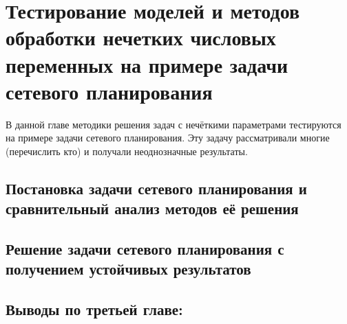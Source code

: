 \chapter{Тестирование моделей и методов обработки нечетких числовых переменных на примере задачи сетевого планирования}
\label{chapter3}

В данной главе методики решения задач с нечёткими параметрами тестируются на примере задачи сетевого планирования. Эту задачу рассматривали многие (перечислить кто) и получали неоднозначные результаты.

\section{Постановка задачи сетевого планирования и сравнительный анализ методов её решения} 
\label{chapter3_1}


\section{Решение задачи сетевого планирования с получением устойчивых результатов}
\label{chapter3_2}


\newpage
\section*{Выводы по третьей главе:} 
\label{chapter3_3}

